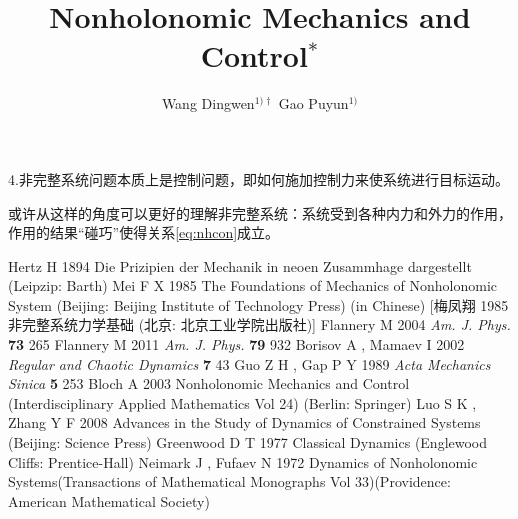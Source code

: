 \documentclass[A4,twoside]{ctexart}
\begin{document}
4.非完整系统问题本质上是控制问题，即如何施加控制力来使系统进行目标运动。

或许从这样的角度可以更好的理解非完整系统：系统受到各种内力和外力的作用，作用的结果“碰巧”使得关系\eqref{eq:nhcon}成立。


\begin{thebibliography}{999}

 Hertz H 1894 Die Prizipien der Mechanik in neoen Zusammhage dargestellt (Leipzip: Barth)
 Mei F X 1985 The Foundations of Mechanics of Nonholonomic System (Beijing: Beijing Institute of Technology Press) (in Chinese) [梅凤翔 1985 非完整系统力学基础 (北京: 北京工业学院出版社)]
 Flannery M 2004 {\it Am. J. Phys.} {\bf 73} 265
 Flannery M 2011 {\it Am. J. Phys.} {\bf 79} 932
 Borisov A , Mamaev I 2002 {\it Regular and Chaotic Dynamics} {\bf 7} 43
 Guo Z H , Gap P Y 1989 {\it Acta Mechanics Sinica} {\bf 5} 253
 Bloch A 2003 Nonholonomic Mechanics and Control (Interdisciplinary Applied Mathematics Vol 24) (Berlin: Springer)
 Luo S K , Zhang Y F 2008 Advances in the Study of Dynamics of Constrained Systems (Beijing: Science Press)
 Greenwood D T 1977 Classical Dynamics (Englewood Cliffs: Prentice-Hall)
 Neimark J , Fufaev N 1972 Dynamics of Nonholonomic Systems(Transactions of Mathematical Monographs Vol 33)(Providence: American Mathematical Society)
\end{thebibliography}

\newpage

\title{{\boldfont}%
Nonholonomic Mechanics and Control$^{\ast}$}

\author{Wang Dingwen$^{1)\dag}$ \quad  Gao Puyun$^{1)}$}



\end{document}

